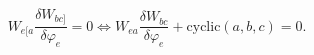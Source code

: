 \begin{equation}
W_{e[a}\frac{\delta W_{bc]}}{\delta \varphi _{e}}=0\Leftrightarrow W_{ea}%
\frac{\delta W_{bc}}{\delta \varphi _{e}}+\mathrm{cyclic}\left( a,b,c\right)
=0.  \label{c27}
\end{equation}

